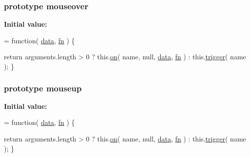 \hypertarget{jquery-1_810_82-vsdoc_8js_a6a0eb7aad006e81b9a2c40c51f12f04e}{
\subsubsection[{mouseover}]{ {\bf prototype} mouseover}}\label{jquery-1_810_82-vsdoc_8js_a6a0eb7aad006e81b9a2c40c51f12f04e}
{\bfseries Initial value\-:}
\begin{DoxyCode}
= \textcolor{keyword}{function}( \hyperlink{jquery-1_810_82-vsdoc_8js_a609407b3456fdc3c5671a9fc4a226ff7}{data}, \hyperlink{jquery-1_810_82-vsdoc_8js_acef6bdaf6b9b20fdcca1ea86f0902c3b}{fn} ) \{


        \textcolor{keywordflow}{return} arguments.length > 0 ?
            this.\hyperlink{jquery-1_810_82-vsdoc_8js_ae453b412b883f60220d73468ef6c6dbc}{on}( name, null, \hyperlink{jquery-1_810_82-vsdoc_8js_a609407b3456fdc3c5671a9fc4a226ff7}{data}, \hyperlink{jquery-1_810_82-vsdoc_8js_acef6bdaf6b9b20fdcca1ea86f0902c3b}{fn} ) :
            this.\hyperlink{jquery-1_810_82-vsdoc_8js_a2388c4114d5e3e4eab020f973641519c}{trigger}( name );
    \}
\end{DoxyCode}
\hypertarget{jquery-1_810_82-vsdoc_8js_adb45f5bdff2560ba1f3ca44f5332221a}{
\subsubsection[{mouseup}]{ {\bf prototype} mouseup}}\label{jquery-1_810_82-vsdoc_8js_adb45f5bdff2560ba1f3ca44f5332221a}
{\bfseries Initial value\-:}
\begin{DoxyCode}
= \textcolor{keyword}{function}( \hyperlink{jquery-1_810_82-vsdoc_8js_a609407b3456fdc3c5671a9fc4a226ff7}{data}, \hyperlink{jquery-1_810_82-vsdoc_8js_acef6bdaf6b9b20fdcca1ea86f0902c3b}{fn} ) \{


        \textcolor{keywordflow}{return} arguments.length > 0 ?
            this.\hyperlink{jquery-1_810_82-vsdoc_8js_ae453b412b883f60220d73468ef6c6dbc}{on}( name, null, \hyperlink{jquery-1_810_82-vsdoc_8js_a609407b3456fdc3c5671a9fc4a226ff7}{data}, \hyperlink{jquery-1_810_82-vsdoc_8js_acef6bdaf6b9b20fdcca1ea86f0902c3b}{fn} ) :
            this.\hyperlink{jquery-1_810_82-vsdoc_8js_a2388c4114d5e3e4eab020f973641519c}{trigger}( name );
    \}
\end{DoxyCode}
